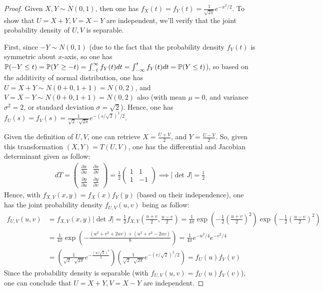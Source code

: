 \documentclass{article}
\begin{document}
\begin{proof}
    Given $X,Y \sim N(0,1)$, then one has $f_X(t)=f_Y(t) = \frac{1}{\sqrt{2\pi}}e^{-x^2/2}$. To show that $U=X+Y, V=X-Y$ are independent, we'll verify that the joint probability density of $U,V$ is separable. 

    \hfil

    First, since $-Y\sim N(0,1)$ (due to the fact that the probability density $f_Y(t)$ is symmetric about $x$-axis, so one has $\mathbb{P}(-Y\leq t) = \mathbb{P}(Y\geq -t) = \int_{-t}^{\infty}f_Y(t)dt = \int_{-\infty}^{t}f_Y(t)dt = \mathbb{P}(Y\leq t)$), so based on the additivity of normal distribution, one has $U=X+Y\sim N(0+0,1+1) = N(0,2)$, and $V=X-Y\sim N(0+0,1+1) = N(0,2)$ also (with mean $\mu=0$, and variance $\sigma^2=2$, or standard deviation $\sigma=\sqrt{2}$). Hence, one has $f_U(s) = f_V(s) = \frac{1}{\sqrt{2}\cdot \sqrt{2\pi}}e^{-(s/\sqrt{2})^2/2}$.

    \hfil

    Given the definition of $U,V$, one can retrieve $X = \frac{U+V}{2}$, and $Y = \frac{U-V}{2}$. So, given this transformation $(X,Y) = T(U,V)$, one has the differential and Jacobian determinant given as follow:
    \begin{align}
        dT = \begin{pmatrix}
            \frac{\partial x}{\partial u} & \frac{\partial x}{\partial v}\\ \frac{\partial y}{\partial u} & \frac{\partial y}{\partial v}
        \end{pmatrix} = \frac{1}{2}\begin{pmatrix}
            1&1\\1&-1
        \end{pmatrix} \implies |\det J| = \frac{1}{2}
    \end{align}
    Hence, with $f_{X,Y}(x,y) = f_X(x)f_Y(y)$ (based on their independence), one has the joint probability density $f_{U,V}(u,v)$ being as follow:
    \begin{align}
        f_{U,V}(u,v) &= f_{X,Y}(x,y)|\det J| = \frac{1}{2}f_{X,Y}\left(\frac{u+v}{2},\frac{u-v}{2}\right) = \frac{1}{4\pi}\exp\left(-\frac{1}{2}\left(\frac{u+v}{2}\right)^2\right)\exp\left(-\frac{1}{2}\left(\frac{u-v}{2}\right)^2\right)\\
        &= \frac{1}{4\pi}\exp\left(-\frac{(u^2+v^2+2uv)+(u^2+v^2-2uv)}{8}\right) = \frac{1}{4\pi}e^{-u^2/4}e^{-v^2/4} \\
        &= \left(\frac{1}{\sqrt{2}\cdot\sqrt{2\pi}}e^{-\frac{(u/\sqrt{2})^2}{2}}\right)\left(\frac{1}{\sqrt{2}\cdot\sqrt{2\pi}}e^{-(v/\sqrt{2})^2/2}\right) = f_U(u)f_V(v)
    \end{align}
    Since the probability density is separable (with $f_{U,V}(u,v) = f_U(u)f_V(v)$), one can conclude that $U=X+Y,V=X-Y$ are independent.
\end{proof}
\end{document}
